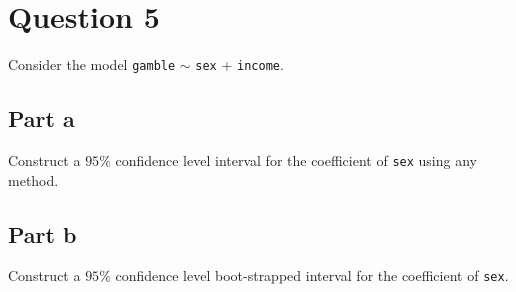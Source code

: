 \section{Question 5}

\begin{question}
    Consider the model \verb+gamble+ $\sim$ \verb+sex+ + \verb+income+.
\end{question}

\subsection{Part a}

\begin{question}
    Construct a $95\%$ confidence level interval for the coefficient of \verb+sex+ using any method.
\end{question}

\begin{answer}
    
\end{answer}

\subsection{Part b}

\begin{question}
    Construct a $95\%$ confidence level boot-strapped interval for the coefficient of \verb+sex+.
\end{question}

\begin{answer}
    
\end{answer}